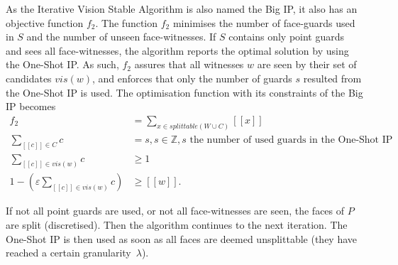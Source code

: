 As the Iterative Vision Stable Algorithm is also named the Big IP, it also has an objective function $f_2$. The function $f_2$ minimises the number of face-guards used in $S$ and the number of unseen face-witnesses. If $S$ contains only point guards and sees all face-witnesses, the algorithm reports the optimal solution by using the One-Shot IP. As such, $f_2$ assures that all witnesses $w$ are seen by their set of candidates $vis(w)$, and enforces that only the number of guards $s$ resulted from the One-Shot IP is used. The optimisation function with its constraints of the Big IP becomes
\begin{align}
	f_2 &= \sum_{x \in splittable(W \cup C)} [[x]] \label{eq:f2}\\
	\sum_{[[c]] \in C} c &= s, s \in \mathbb Z, s \text{ the number of used guards in the One-Shot IP} \\
	\sum_{[[c]] \in vis(w)} c &\geq 1 \\
	1 - (\varepsilon \sum_{[[c]] \in vis(w)} c) &\geq [[w]].
\end{align}

If not all point guards are used, or not all face-witnesses are seen, the faces of $P$ are split (discretised). Then the algorithm continues to the next iteration. The One-Shot IP is then used as soon as all faces are deemed unsplittable (they have reached a certain granularity~$\lambda$). 



